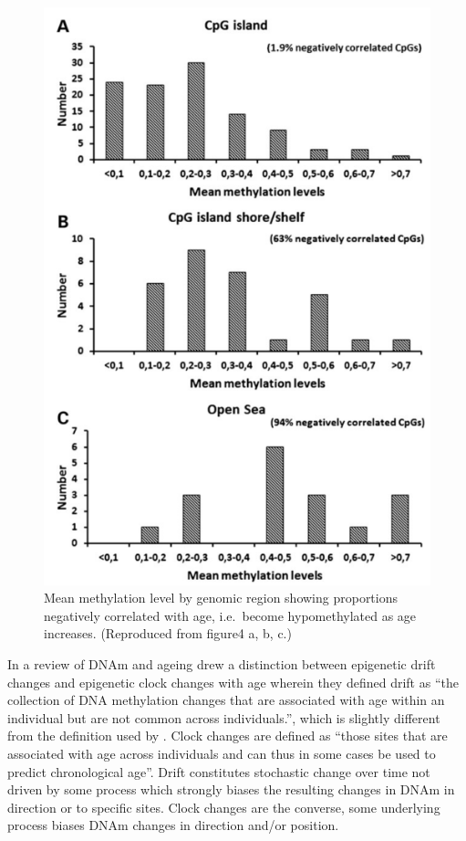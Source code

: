 \documentclass[
]{book}
\begin{document}
\begin{figure}
\includegraphics[width=6.94in]{figs/Florath2014_F4abc} \caption{Mean methylation level by genomic region showing proportions negatively correlated with age, i.e.~become hypomethylated as age increases.
(Reproduced from \citet{Florath2014} figure4 a, b, c.)}\label{fig:Florath2014F4abc}
\end{figure}




In a review of DNAm and ageing \citet{Jones2015} drew a distinction between epigenetic drift changes and epigenetic clock changes with age wherein they defined drift as ``the collection of DNA methylation changes that are associated with age within an individual but are not common across individuals.'', which is slightly different from the definition used by \citet{Fraga2005}. Clock changes are defined as ``those sites that are associated with age across individuals and can thus in some cases be used to predict chronological age''. Drift constitutes stochastic change over time not driven by some process which strongly biases the resulting changes in DNAm in direction or to specific sites. Clock changes are the converse, some underlying process biases DNAm changes in direction and/or position.
\end{document}
